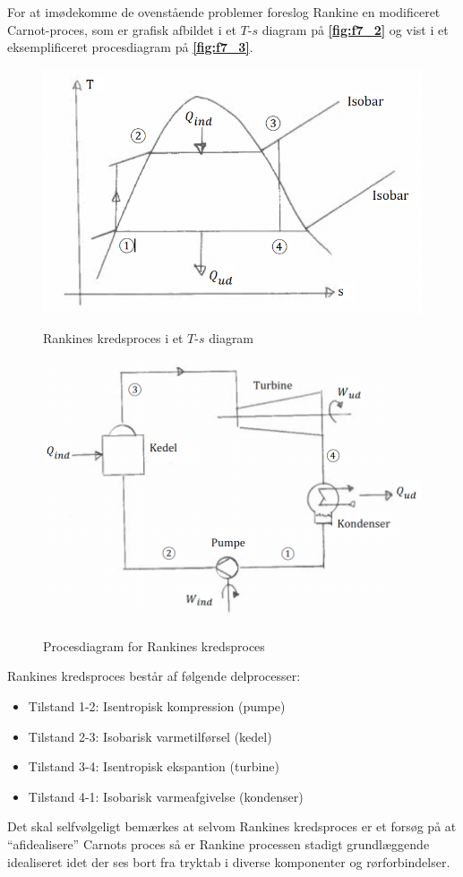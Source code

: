 For at imødekomme de ovenstående problemer foreslog Rankine en modificeret Carnot-proces, som er grafisk afbildet i et $T$-$s$ diagram på \textbf{\autoref{fig:f7_2}} og vist i et eksemplificeret procesdiagram på \textbf{\autoref{fig:f7_3}}. 
\begin{figure} [ht]
  \centering
  \caption{Rankines kredsproces i et $T$-$s$ diagram}
  \includegraphics[width=0.5\linewidth]{./figures/f7_2.png}
  \label{fig:f7_2}
\end{figure}
\begin{figure} [ht]
  \centering
  \caption{Procesdiagram for Rankines kredsproces}
  \includegraphics[width=0.5\linewidth]{./figures/f7_3.png}
  \label{fig:f7_3}
\end{figure}
Rankines kredsproces består af følgende delprocesser:
\begin{itemize}
  \item Tilstand 1-2: Isentropisk kompression (pumpe)
  \item Tilstand 2-3: Isobarisk varmetilførsel (kedel)
  \item Tilstand 3-4: Isentropisk ekspantion (turbine)
  \item Tilstand 4-1: Isobarisk varmeafgivelse (kondenser)
\end{itemize}
Det skal selfvølgeligt bemærkes at selvom Rankines kredsproces er et forsøg på at ``afidealisere'' Carnots proces så er Rankine processen stadigt grundlæggende idealiseret idet der ses bort fra tryktab i diverse komponenter og rørforbindelser.

